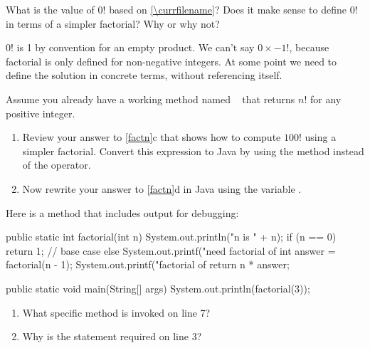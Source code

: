 \Q What is the value of $0!$ based on \ref{\currfilename}?
Does it make sense to define $0!$ in terms of a simpler factorial?
Why or why not?

\begin{answer}
$0!$ is 1 by convention for an empty product.
We can't say $0 \times -1!$, because factorial is only defined for non-negative integers.
At some point we need to define the solution in concrete terms, without referencing itself.
\end{answer}




\Q Assume you already have a working method named ~ that returns $n!$ for any positive integer.

\begin{enumerate}
\item Review your answer to \ref{factn}c that shows how to compute $100!$ using a simpler factorial.
Convert this expression to Java by using the  method instead of the \java{!} operator.


\item Now rewrite your answer to \ref{factn}d in Java using the variable .

\end{enumerate}


\Q \label{factjava} Here is a  method that includes output for debugging:

\begin{javabox}
public static int factorial(int n) {
    System.out.println("n is " + n);
    if (n == 0) {
        return 1;  // base case
    } else {
        System.out.printf("need factorial of %
        int answer = factorial(n - 1);
        System.out.printf("factorial of %
        return n * answer;
    }
}

public static void main(String[] args) {
    System.out.println(factorial(3));
}
\end{javabox}

\begin{enumerate}
\item What specific method is invoked on line 7?


\item Why is the  statement required on line 3?

\end{enumerate}


